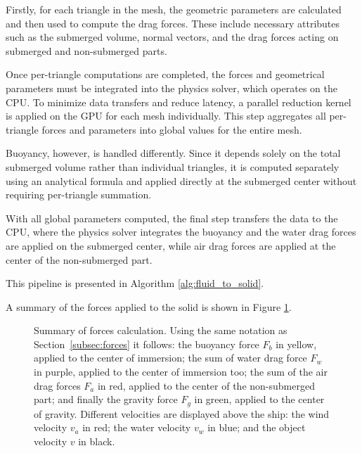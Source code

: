 \documentclass[11pt]{article}
\begin{document}
Firstly, for each triangle in the mesh, the geometric parameters are calculated and then used to compute the drag forces. These include necessary attributes such as the submerged volume, normal vectors, and the drag forces acting on submerged and non-submerged parts.

Once per-triangle computations are completed, the forces and geometrical parameters must be integrated into the physics solver, which operates on the CPU. To minimize data transfers and reduce latency, a parallel reduction kernel is applied on the GPU for each mesh individually. This step aggregates all per-triangle forces and parameters into global values for the entire mesh.

Buoyancy, however, is handled differently. Since it depends solely on the total submerged volume rather than individual triangles, it is computed separately using an analytical formula and applied directly at the submerged center without requiring per-triangle summation.

With all global parameters computed, the final step transfers the data to the CPU, where the physics solver integrates the buoyancy and the water drag forces are applied on the submerged center, while air drag forces are applied at the center of the non-submerged part.

This pipeline is presented in Algorithm \ref{alg:fluid_to_solid}.



A summary of the forces applied to the solid is shown in Figure \ref{fig:forcesComputation}.

\begin{figure}[!h]
	\centering
	
	\caption{Summary of forces calculation. Using the same notation as Section~\ref{subsec:forces} it follows:
		the buoyancy force \textcolor{jauneC}{$F_b$} in \textcolor{jauneC}{yellow}, applied to the center of immersion;
		the sum of water drag force \textcolor{purpleF}{$F_w$} in \textcolor{purpleF}{purple}, applied to the center of immersion too;
		the sum of the air drag forces \textcolor{redF}{$F_a$} in \textcolor{redF}{red}, applied to the center of the non-submerged part;
		and finally the gravity force \textcolor{greenF}{$F_g$} in \textcolor{greenF}{green}, applied to the center of gravity.
		Different velocities are displayed above the ship:
		the wind velocity \textcolor{redF}{$v_a$} in \textcolor{redF}{red};
		the water velocity \textcolor{bleuF}{$v_w$} in \textcolor{bleuF}{blue};
		and the object velocity \textcolor{noirC}{$v$} in \textcolor{noirC}{black}.}
	\label{fig:forcesComputation}
\end{figure}
\end{document}
